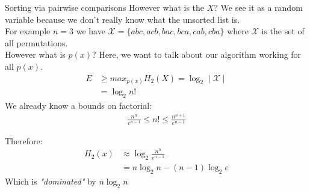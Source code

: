 \begin{parag}{Sorting via pairwise comparisons}
However what is the $X$? We see it as a random variable because we don't really know what the unsorted list is.\\
For example $n = 3$ we have $ \mathcal{X} = \{ abc, acb, bac, bca, cab, cba\}$ where $ \mathcal{X}$ is the set of all permutations.
\\
However what is $p(x)$? Here, we want to talk  about our algorithm working for all $p(x)$.
\\
\begin{align*}
    E &\geq max_{p(x)}H_2(X) = \log_2 \mid \mathcal{X} \mid \\
    &= \log_2 n!
\end{align*}
We already know a bounds on factorial:
\begin{align*}
    \frac{n^n}{e^{n-1}} \leq n! \leq \frac{n^{n+1}}{e^{n-1}}
\end{align*}

Therefore:
\begin{align*}
    H_2(x) &\approx \log_2 \frac{n^n}{e^{n-1}} \\
           &= n \log_2n - (n-1)\log_2 e
\end{align*}
Which is \textit{"dominated"} by $n\log_2 n$

\end{parag}

